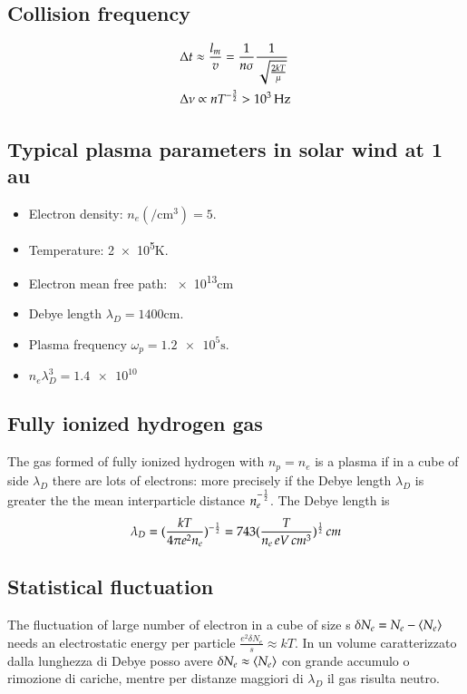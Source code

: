 \documentclass[main.tex]{subfiles}
\begin{document}
\subsection{Collision frequency}

\begin{align*}
&\Delta t\approx\frac{l_m}{v}=\frac{1}{n\sigma}\frac{1}{\sqrt{\frac{2kT}{\mu}}}\\
&\Delta\nu\propto n T^{-\frac{3}{2}}>\SI{e3}{\hertz}
\end{align*}

\subsection{Typical plasma parameters in solar wind at 1 \si{\astronomicalunit}}

\begin{itemize}
\item Electron density: $n_e(\si{\per\cubic\cm})=5$.
\item Temperature: \num{2e5}\si{\kelvin}.
\item Electron mean free path: \num{e13}\si{\cm}
\item Debye length $\lambda_D=\num{1400}\si{\cm}$.
\item Plasma frequency $\omega_p=\num{1.2e5}\si{\second}$.
\item $n_e\lambda_D^3=\num{1.4e10}$
\end{itemize}


\subsection{Fully ionized hydrogen gas}

The gas formed of fully ionized hydrogen with $n_p=n_e$ is a plasma if in a cube of side $\lambda_D$ there are lots of electrons: more precisely if the Debye length $\lambda_D$ is greater the the mean interparticle distance $n_e^{-\frac{1}{2}}$. The Debye length is
\begin{equation*}
\lambda_D=(\frac{kT}{4\pi e^2n_e})^{-\frac{1}{2}}=743(\frac{T}{n_e\,eV\,cm^3})^{\frac{1}{2}}\,cm
\end{equation*}

\subsection{Statistical fluctuation}

The fluctuation of large number of electron in a cube of size s $\delta N_e=N_e-\langle N_e \rangle$ needs an electrostatic energy per particle $\frac{e^2\delta N_e}{s}\approx kT$. In un volume caratterizzato dalla lunghezza di Debye posso avere $\delta N_e\approx\langle N_e \rangle$ con grande accumulo o rimozione di cariche, mentre per distanze maggiori di $\lambda_D$ il gas risulta neutro.
\end{document}
